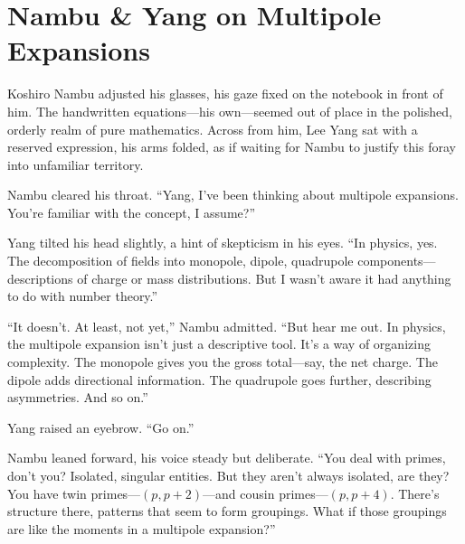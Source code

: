 % 
% 
\section*{Nambu \& Yang on Multipole Expansions}

Koshiro Nambu adjusted his glasses, his gaze fixed on the notebook in front of him. The handwritten equations—his own—seemed out of place in the polished, orderly realm of pure mathematics. Across from him, Lee Yang sat with a reserved expression, his arms folded, as if waiting for Nambu to justify this foray into unfamiliar territory.

Nambu cleared his throat. “Yang, I’ve been thinking about multipole expansions. You’re familiar with the concept, I assume?”

Yang tilted his head slightly, a hint of skepticism in his eyes. “In physics, yes. The decomposition of fields into monopole, dipole, quadrupole components—descriptions of charge or mass distributions. But I wasn’t aware it had anything to do with number theory.”

“It doesn’t. At least, not yet,” Nambu admitted. “But hear me out. In physics, the multipole expansion isn’t just a descriptive tool. It’s a way of organizing complexity. The monopole gives you the gross total—say, the net charge. The dipole adds directional information. The quadrupole goes further, describing asymmetries. And so on.”

Yang raised an eyebrow. “Go on.”

Nambu leaned forward, his voice steady but deliberate. “You deal with primes, don’t you? Isolated, singular entities. But they aren’t always isolated, are they? You have twin primes—\( (p, p+2) \)—and cousin primes—\( (p, p+4) \). There’s structure there, patterns that seem to form groupings. What if those groupings are like the moments in a multipole expansion?”

